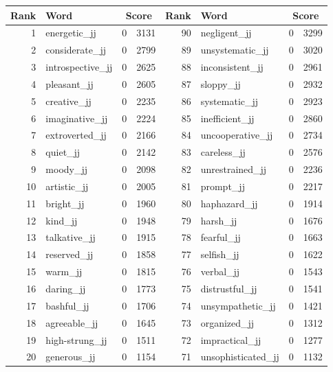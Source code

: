 \begin{table}[tbp]
    \begin{tabular}{| rlr@{.}l | rlr@{.}l |}
    \hline
    \textbf{Rank} & \textbf{Word} & \multicolumn{2}{c|}{\textbf{Score}} & \textbf{Rank} & \textbf{Word} & \multicolumn{2}{c|}{\textbf{Score}} \\
    \hline
    1 & energetic\_jj & 0 & 3131    &    90 & negligent\_jj & 0 & 3299 \\
    2 & considerate\_jj & 0 & 2799    &    89 & unsystematic\_jj & 0 & 3020 \\
    3 & introspective\_jj & 0 & 2625    &    88 & inconsistent\_jj & 0 & 2961 \\
    4 & pleasant\_jj & 0 & 2605    &    87 & sloppy\_jj & 0 & 2932 \\
    5 & creative\_jj & 0 & 2235    &    86 & systematic\_jj & 0 & 2923 \\
    6 & imaginative\_jj & 0 & 2224    &    85 & inefficient\_jj & 0 & 2860 \\
    7 & extroverted\_jj & 0 & 2166    &    84 & uncooperative\_jj & 0 & 2734 \\
    8 & quiet\_jj & 0 & 2142    &    83 & careless\_jj & 0 & 2576 \\
    9 & moody\_jj & 0 & 2098    &    82 & unrestrained\_jj & 0 & 2236 \\
    10 & artistic\_jj & 0 & 2005    &    81 & prompt\_jj & 0 & 2217 \\
    11 & bright\_jj & 0 & 1960    &    80 & haphazard\_jj & 0 & 1914 \\
    12 & kind\_jj & 0 & 1948    &    79 & harsh\_jj & 0 & 1676 \\
    13 & talkative\_jj & 0 & 1915    &    78 & fearful\_jj & 0 & 1663 \\
    14 & reserved\_jj & 0 & 1858    &    77 & selfish\_jj & 0 & 1622 \\
    15 & warm\_jj & 0 & 1815    &    76 & verbal\_jj & 0 & 1543 \\
    16 & daring\_jj & 0 & 1773    &    75 & distrustful\_jj & 0 & 1541 \\
    17 & bashful\_jj & 0 & 1706    &    74 & unsympathetic\_jj & 0 & 1421 \\
    18 & agreeable\_jj & 0 & 1645    &    73 & organized\_jj & 0 & 1312 \\
    19 & high-strung\_jj & 0 & 1511    &    72 & impractical\_jj & 0 & 1277 \\
    20 & generous\_jj & 0 & 1154    &    71 & unsophisticated\_jj & 0 & 1132 \\

\end{tabular}
\end{table}
